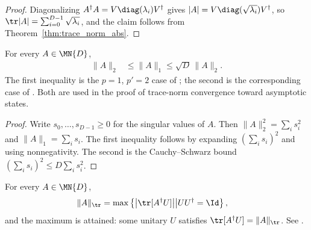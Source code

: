 \begin{proof}\leanok
    Diagonalizing $A^\dagger A=V\diag(\lambda_i)V^\dagger$ gives
    $\lvert A\rvert=V\diag(\sqrt{\lambda_i})V^\dagger$, so
    $\tr\lvert A\rvert=\sum_{i=0}^{D-1}\sqrt{\lambda_i}$,
    and the claim follows from Theorem~\ref{thm:trace_norm_abs}.
\end{proof}

\begin{theorem}
    \label{thm:trace_norm_frobenius_comparison}
    \leanok
    For every $A\in\MN{D}$,
    \begin{align}
        \lVert A\rVert_2
         & \leq \lVert A\rVert_1
        \leq \sqrt D\,\lVert A\rVert_2.
        \label{eq:trace_norm_frobenius_comparison}
    \end{align}
    The first inequality is the $p=1$, $p'=2$ case of
    \cite[Eq.~(8.1)]{Wolf2012Quantum}; the second is the corresponding case
    of \cite[Eq.~(8.7)]{Wolf2012Quantum}. Both are used in the proof of
    trace-norm convergence toward asymptotic states.
\end{theorem}

\begin{proof}\leanok
    Write $s_0,\ldots,s_{D-1}\geq0$ for the singular values of $A$.
    Then $\lVert A\rVert_2^2=\sum_i s_i^2$ and
    $\lVert A\rVert_1=\sum_i s_i$. The first inequality follows by expanding
    $(\sum_i s_i)^2$ and using nonnegativity. The second is the
    Cauchy--Schwarz bound
    $(\sum_i s_i)^2\leq D\sum_i s_i^2$.
\end{proof}

\begin{theorem}
    \label{thm:trace_norm_variational}
    \leanok
    For every $A\in\MN{D}$,
    \begin{align}
        \lVert A\rVert_{\tr}
         & =\max\left\{\bigl|\tr[A^\dagger U]\bigr|
        \middle|  UU^\dagger=\Id\right\},
        \label{eq:entropy_trace_norm_variational}
    \end{align}
    and the maximum is attained: some unitary $U$ satisfies
    $\tr[A^\dagger U]=\lVert A\rVert_{\tr}$.
    See \cite[Chapter~8, Eq.~(8.11)]{Wolf2012Quantum}.
\end{theorem}

